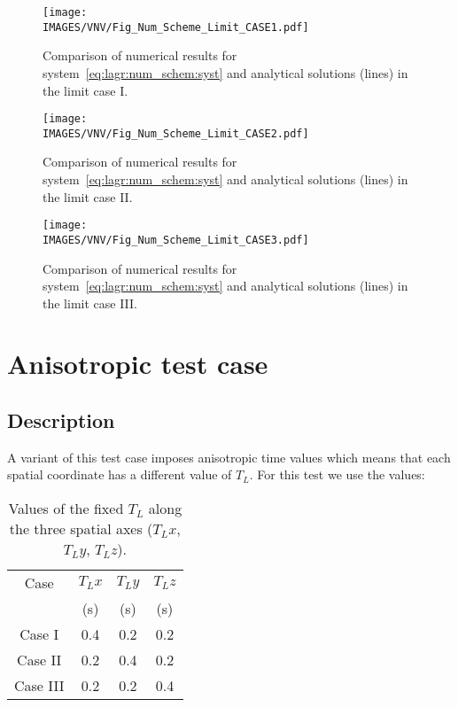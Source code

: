 \begin{figure}[H]
    \centering
    \texttt{[image: \\IMAGES/VNV/Fig\_Num\_Scheme\_Limit\_CASE1.pdf]}
  \caption{Comparison of numerical results for system~\ref{eq:lagr:num_schem:syst} and analytical solutions (lines) in the limit case I.}
  \label{Fig_NUM_SCHEME_LIMIT_CASE_I}
\end{figure}

\begin{figure}[H]
    \centering
    \texttt{[image: \\IMAGES/VNV/Fig\_Num\_Scheme\_Limit\_CASE2.pdf]}
  \caption{Comparison of numerical results for system~\ref{eq:lagr:num_schem:syst} and analytical solutions (lines) in the limit case II.}
  \label{Fig_NUM_SCHEME_LIMIT_CASE_II}
\end{figure}

\begin{figure}[H]
    \centering
    \texttt{[image: \\IMAGES/VNV/Fig\_Num\_Scheme\_Limit\_CASE3.pdf]}
  \caption{Comparison of numerical results for system~\ref{eq:lagr:num_schem:syst} and analytical solutions (lines) in the limit case III.}
  \label{Fig_NUM_SCHEME_LIMIT_CASE_III}
\end{figure}

\section{Anisotropic test case}
\subsection{Description}
A variant of this test case imposes anisotropic time values which means that each spatial coordinate has a different value of $T_L$. For this test we use the values:

\begin{table}[H]
    \begin{center}
        \begin{tabular}{|c|c|c|c|}
            \hline
            Case 		& $T_Lx$  & $T_Ly$  & $T_Lz$ \\
                		& (s)	  & (s)     & (s)    \\
            \hline
            Case I	    & 0.4    & 0.2    & 0.2	     \\
            \hline
            Case II	    & 0.2    & 0.4    & 0.2	     \\
            \hline
            Case III	& 0.2    & 0.2    & 0.4	     \\
            \hline
        \end{tabular}
        \caption{Values of the fixed $T_L$ along the three spatial axes ($T_Lx$, $T_Ly$, $T_Lz$).}
        \label{Tab_NUM_SCHEME_ANISO_cases}
    \end{center}
\end{table}

